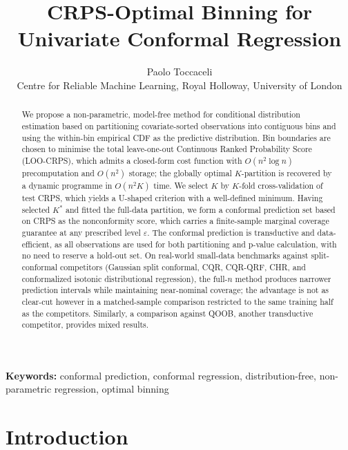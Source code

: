 \documentclass[11pt]{article}
\title{CRPS-Optimal Binning for Univariate Conformal Regression}
\author{Paolo Toccaceli \\[4pt] \small Centre for Reliable Machine Learning, Royal Holloway, University of London}
\date{}
\begin{document}
\maketitle



\begin{abstract}
We propose a non-parametric, model-free method for conditional distribution estimation
based on partitioning covariate-sorted observations into contiguous bins and using the
within-bin empirical CDF as the predictive distribution.
Bin boundaries are chosen to minimise the total leave-one-out Continuous Ranked Probability
Score (LOO-CRPS), which admits a closed-form cost function with $O(n^2 \log n)$
precomputation and $O(n^2)$ storage; the globally optimal $K$-partition is recovered by a
dynamic programme in $O(n^2 K)$ time.
We select $K$ by $K$-fold cross-validation of test CRPS, which yields a U-shaped
criterion with a well-defined minimum.
Having selected $K^*$ and fitted the full-data partition, we form
a conformal prediction set based on CRPS
as the nonconformity score, which carries a finite-sample marginal coverage guarantee at
any prescribed level $\varepsilon$. The conformal prediction is transductive and data-efficient, 
as all observations are used for both partitioning and p-value calculation, with no need to 
reserve a hold-out set.
On real-world small-data benchmarks against split-conformal competitors (Gaussian split conformal,
CQR, CQR-QRF, CHR, and conformalized isotonic distributional regression), the full-$n$
method produces narrower prediction intervals while maintaining near-nominal coverage;
the advantage is not as clear-cut however in a matched-sample comparison restricted to the 
same training half as the competitors. Similarly, a comparison against 
QOOB, another transductive competitor, provides mixed results.
\end{abstract}

\noindent\textbf{Keywords:} conformal prediction, conformal regression, distribution-free, non-parametric regression, optimal binning

\section{Introduction}
\end{document}
